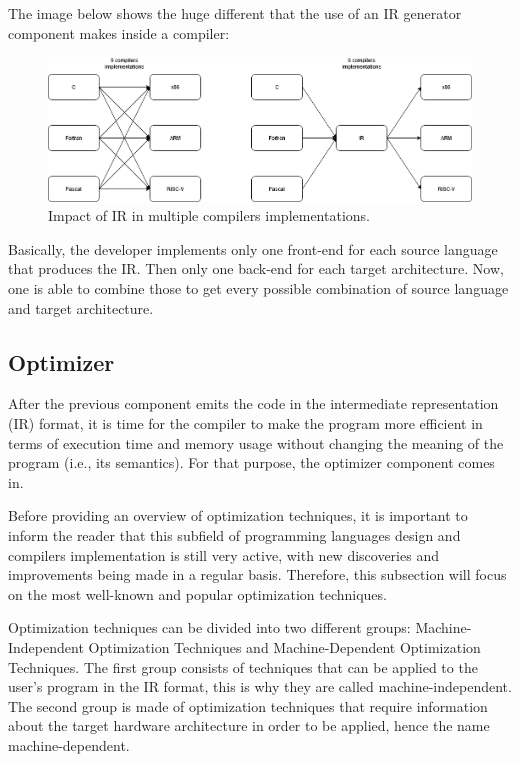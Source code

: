 The image below shows the huge different that the use of an IR generator component makes inside a compiler:

\begin{figure}[H]  
  \centering
  \includegraphics[width=\textwidth, height=\textheight, keepaspectratio]{Figures/Arquiteturas/IRImpact.png}  
  \caption{Impact of IR in multiple compilers implementations.}
  \label{fig:IRImpact}
\end{figure}

Basically, the developer implements only one front-end for each source language that produces the IR. Then only one back-end for each target architecture. Now, one is able to combine those to get every possible combination of source language and target architecture.

\subsection{Optimizer}
After the previous component emits the code in the intermediate representation (IR) format, it is time for the compiler to make the program more efficient in terms of execution time and memory usage without changing the meaning of the program (i.e., its semantics). For that purpose, the optimizer component comes in.

Before providing an overview of optimization techniques, it is important to inform the reader that this subfield of programming languages design and compilers implementation is still very active, with new discoveries and improvements being made in a regular basis. Therefore, this subsection will focus on the most well-known and popular optimization techniques.

Optimization techniques can be divided into two different groups: Machine-Independent Optimization Techniques and Machine-Dependent Optimization Techniques. The first group consists of techniques that can be applied to the user's program in the IR format, this is why they are called machine-independent. The second group is made of optimization techniques that require information about the target hardware architecture in order to be applied, hence the name machine-dependent.

